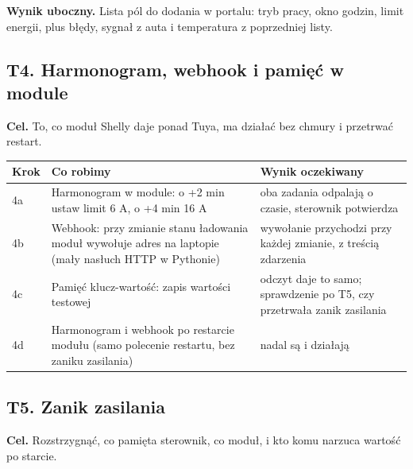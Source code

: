 \documentclass[11pt,a4paper]{article}
\begin{document}
\textbf{Wynik uboczny.} Lista pól do dodania w portalu: tryb pracy, okno godzin, limit energii, plus błędy, sygnał z auta i temperatura z poprzedniej listy.


\subsection{T4. Harmonogram, webhook i pamięć w module}

\textbf{Cel.} To, co moduł Shelly daje ponad Tuya, ma działać bez chmury i przetrwać restart.


\begin{longtable}{>{\raggedright\arraybackslash}p{3.00cm}>{\raggedright\arraybackslash}p{7.13cm}>{\raggedright\arraybackslash}p{5.15cm}}
\toprule
\rowcolor{apteallight}\textbf{Krok} & \textbf{Co robimy} & \textbf{Wynik oczekiwany} \\
\midrule\endhead
\bottomrule\endfoot
4a & Harmonogram w module: o +2 min ustaw limit 6 A, o +4 min 16 A & oba zadania odpalają o czasie, sterownik potwierdza \\
4b & Webhook: przy zmianie stanu ładowania moduł wywołuje adres na laptopie (mały nasłuch HTTP w Pythonie) & wywołanie przychodzi przy każdej zmianie, z treścią zdarzenia \\
4c & Pamięć klucz-wartość: zapis wartości testowej & odczyt daje to samo; sprawdzenie po T5, czy przetrwała zanik zasilania \\
4d & Harmonogram i webhook po restarcie modułu (samo polecenie restartu, bez zaniku zasilania) & nadal są i działają \\
\end{longtable}

\subsection{T5. Zanik zasilania}

\textbf{Cel.} Rozstrzygnąć, co pamięta sterownik, co moduł, i kto komu narzuca wartość po starcie.
\end{document}
